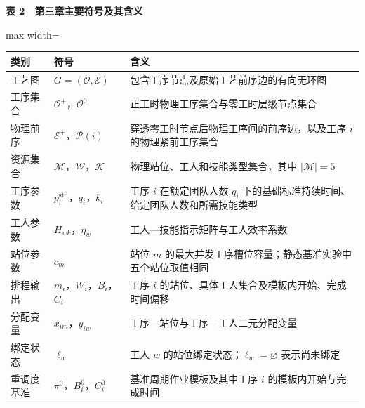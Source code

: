 \documentclass[journal,10pt]{IEEEtran}
\renewcommand{\arraystretch}{1.08}
\begin{document}
\begin{table}[!t]
\centering
\footnotesize
\textbf{表 2　第三章主要符号及其含义}\par\smallskip
\setlength{\tabcolsep}{3pt}
\renewcommand{\arraystretch}{1.08}
\begin{adjustbox}{max width=\textwidth}
\begin{tabular}{@{}
  >{\raggedright\arraybackslash}p{}
  >{\raggedright\arraybackslash}p{}
  >{\raggedright\arraybackslash}p{}@{}}
\toprule
\begin{minipage}[b]{\linewidth}\raggedright
类别
\end{minipage} & \begin{minipage}[b]{\linewidth}\raggedright
符号
\end{minipage} & \begin{minipage}[b]{\linewidth}\raggedright
含义
\end{minipage} \\
\midrule
工艺图 & \(G=(\mathcal{O},\mathcal{E})\) & 包含工序节点及原始工艺前序边的有向无环图 \\
工序集合 & \(\mathcal{O}^{+}\)，\(\mathcal{O}^{0}\) & 正工时物理工序集合与零工时层级节点集合 \\
物理前序 & \(\mathcal{E}^{+}\)，\(\mathcal{P}(i)\) & 穿透零工时节点后物理工序间的前序边，以及工序 \(i\) 的物理紧前工序集合 \\
资源集合 & \(\mathcal{M}\)，\(\mathcal{W}\)，\(\mathcal{K}\) & 物理站位、工人和技能类型集合，其中 \(\vert\mathcal{M}\vert=5\) \\
工序参数 & \(p_i^{\mathrm{std}}\)，\(q_i\)，\(k_i\) & 工序 \(i\) 在额定团队人数 \(q_i\) 下的基础标准持续时间、给定团队人数和所需技能类型 \\
工人参数 & \(H_{wk}\)，\(\eta_w\) & 工人---技能指示矩阵与工人效率系数 \\
站位参数 & \(c_m\) & 站位 \(m\) 的最大并发工序槽位容量；静态基准实验中五个站位取值相同 \\
排程输出 & \(m_i\)，\(W_i\)，\(B_i\)，\(C_i\) & 工序 \(i\) 的站位、具体工人集合及模板内开始、完成时间偏移 \\
分配变量 & \(x_{im}\)，\(y_{iw}\) & 工序---站位与工序---工人二元分配变量 \\
绑定状态 & \(\ell_w\) & 工人 \(w\) 的站位绑定状态；\(\ell_w=\varnothing\) 表示尚未绑定 \\
重调度基准 & \(\pi^0\)，\(B_i^0\)，\(C_i^0\) & 基准周期作业模板及其中工序 \(i\) 的模板内开始与完成时间 \\

\end{tabular}
\end{adjustbox}
\end{table}
\end{document}
